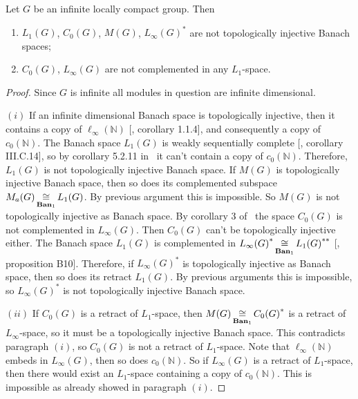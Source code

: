 \begin{proposition}\label{StdModAreNotRetrOfL1LInf} Let $G$ be an infinite
locally compact group. Then

\begin{enumerate}[label = (\roman*)]
    \item $L_1(G)$, $C_0(G)$, $M(G)$, ${L_\infty(G)}^*$ are not 
    topologically injective Banach spaces;

    \item $C_0(G)$, $L_\infty(G)$ are not complemented in any $L_1$-space.
\end{enumerate}
\end{proposition}
\begin{proof}
Since $G$ is infinite all modules in question are infinite dimensional.

$(i)$ If an infinite dimensional Banach space is topologically injective, then it
contains a copy of $\ell_\infty(\mathbb{N})$ [\cite{RosOnRelDisjFamOfMeas},
corollary 1.1.4], and consequently a copy of $c_0(\mathbb{N})$. The Banach space
$L_1(G)$ is weakly sequentially complete [\cite{WojBanSpForAnalysts}, corollary
III.C.14], so by corollary 5.2.11 in~\cite{KalAlbTopicsBanSpTh} it can't contain
a copy of $c_0(\mathbb{N})$. Therefore, $L_1(G)$ is not topologically injective
Banach space.  If $M(G)$ is topologically injective Banach space, then so does
its complemented subspace $M_a(G)\mathop{\mathbin{\cong}}\limits_{\mathbf{Ban}_1}L_1(G)$. By previous
argument this is impossible. So $M(G)$ is not topologically injective as Banach
space. By corollary 3 of~\cite{LauMingComplSubspInLInfOfG} the space $C_0(G)$ is
not complemented in $L_\infty(G)$. Then $C_0(G)$ can't be topologically
injective either. The Banach space $L_1(G)$ is complemented in
${L_\infty(G)}^*\mathop{\mathbin{\cong}}\limits_{\mathbf{Ban}_1}{L_1(G)}^{**}$ [\cite{DefFloTensNorOpId},
proposition  B10]. Therefore, if ${L_\infty(G)}^*$ is topologically injective as
Banach space, then so does its retract $L_1(G)$. By previous arguments this is
impossible, so ${L_\infty(G)}^*$ is not topologically injective Banach space.

$(ii)$ If $C_0(G)$ is a retract of $L_1$-space, then
$M(G)\mathop{\mathbin{\cong}}\limits_{\mathbf{Ban}_1}{C_0(G)}^*$ is a retract of $L_\infty$-space, 
so it must be a topologically injective Banach space. This contradicts 
paragraph $(i)$, so $C_0(G)$ is not a retract of $L_1$-space. 
Note that $\ell_\infty(\mathbb{N})$ embeds in $L_\infty(G)$, then so 
does $c_0(\mathbb{N})$. So if $L_\infty(G)$ is
a retract of $L_1$-space, then there would exist an $L_1$-space containing a
copy of $c_0(\mathbb{N})$. This is impossible as already showed in paragraph
$(i)$.
\end{proof}


